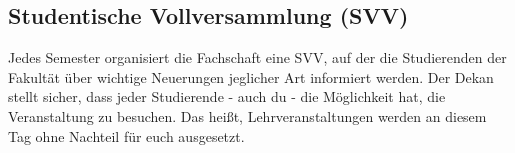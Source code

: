 \subsection{Studentische Vollversammlung (SVV)}
Jedes Semester organisiert die Fachschaft eine SVV, auf der die 
Studierenden der Fakultät über wichtige Neuerungen jeglicher Art 
informiert werden. Der Dekan stellt sicher, dass jeder Studierende - 
auch du - die Möglichkeit hat, die Veranstaltung zu besuchen. Das heißt, 
Lehrveranstaltungen werden an diesem Tag ohne Nachteil für euch 
ausgesetzt. 